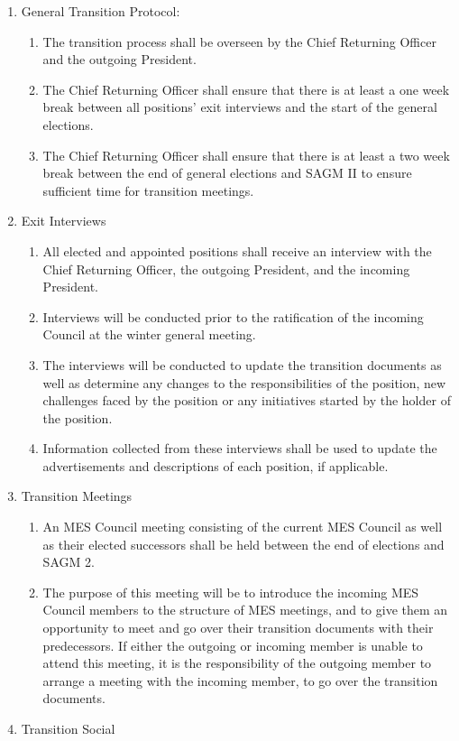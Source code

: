 \begin{enumerate}
 \item
  General Transition Protocol:

  \begin{enumerate}
   \item
    The transition process shall be overseen by the Chief Returning Officer and the outgoing President.
   \item
    The Chief Returning Officer shall ensure that there is at least a one week break between all positions' exit interviews and the start of the general elections.
   \item
    The Chief Returning Officer shall ensure that there is at least a two week break between the end of general elections and SAGM II to ensure sufficient time for transition meetings.
  \end{enumerate}
 \item
  Exit Interviews

  \begin{enumerate}
   \item
    All elected and appointed positions shall receive an interview with the Chief Returning Officer, the outgoing President, and the incoming President.
   \item
    Interviews will be conducted prior to the ratification of the incoming Council at the winter general meeting.
   \item
    The interviews will be conducted to update the transition documents as well as determine any changes to the responsibilities of the position, new challenges faced by the position or any initiatives started by the holder of the position.
   \item
    Information collected from these interviews shall be used to update the advertisements and descriptions of each position, if applicable.
  \end{enumerate}
 \item
  Transition Meetings

  \begin{enumerate}
   \item
    An MES Council meeting consisting of the current MES Council as well as their elected successors shall be held between the end of elections and SAGM 2.
   \item
    The purpose of this meeting will be to introduce the incoming MES Council members to the structure of MES meetings, and to give them an opportunity to meet and go over their transition documents with their predecessors. If either the outgoing or incoming member is unable to attend this meeting, it is the responsibility of the outgoing member to arrange a meeting with the incoming member, to go over the transition documents.
  \end{enumerate}
 \item
  Transition Social


\end{enumerate}
